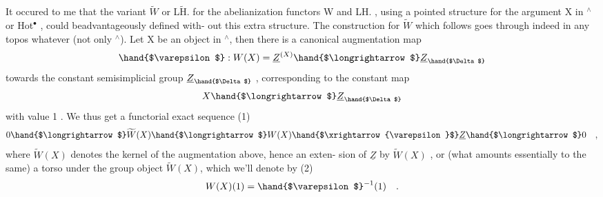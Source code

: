 It occured to me that the variant $\widetilde{W}$ or L$\widetilde{\mathrm{H}}$. 
for the abelianization functors W and LH. ,  using a pointed structure
for the argument X in \hand{$\Delta$}$^{\wedge}$ or Hot$^{\bullet}$ , could be\hand{|}advantageously defined with-%
out this extra structure. The construction for $\widetilde{W}$ which follows goes
through indeed in any topos whatever (not only \hand{$\Delta$}$^{\wedge}$). Let X be an object
in \hand{$\Delta$}$^{\wedge}$, then there is a canonical augmentation map
\[ \hand{$\varepsilon$} : W(X) = \underline{Z}^{(X)} \hand{$\longrightarrow$} \underline{Z}_{\hand{$\Delta$}} \]
towards the constant semisimplicial group $\underline{Z}_{\hand{$\Delta$}}$ , corresponding to the
constant map
\[ X \hand{$\longrightarrow$} \underline{Z}_{\hand{$\Delta$}} \]
with value 1 . We thus get a functorial exact sequence
(1) \[ 0 \hand{$\longrightarrow$} \widetilde{W}(X) \hand{$\longrightarrow$} W(X) \hand{$\xrightarrow{\varepsilon}$} \underline{Z} \hand{$\longrightarrow$} 0 \quad , \]
where $\widetilde{W}(X)$ denotes the kernel of the augmentation above, hence an exten-%
sion of $\underline{Z}$ by $\widetilde{W}(X)$ , or (what amounts essentially to the same) a torso
under the group object $\widetilde{W}(X)$, which we'll denote by
(2) \[ W(X)(1) = \hand{$\varepsilon$}^{-1}(1) \quad . \]

